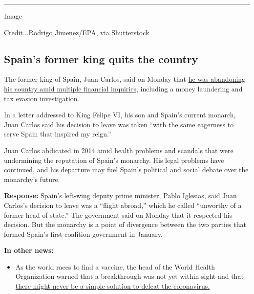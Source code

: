 \begin{center}\rule{0.5\linewidth}{\linethickness}\end{center}

Image

Credit...Rodrigo Jimenez/EPA, via Shutterstock

\hypertarget{spains-former-king-quits-the-country}{%
\subsection{Spain's former king quits the
country}\label{spains-former-king-quits-the-country}}

The former king of Spain, Juan Carlos, said on Monday that
\href{https://www.nytimes.com/2020/08/03/world/europe/juan-carlos-leaves-spain.html}{he
was abandoning his country amid multiple financial inquiries}, including
a money laundering and tax evasion investigation.

In a letter addressed to King Felipe VI, his son and Spain's current
monarch, Juan Carlos said his decision to leave was taken ``with the
same eagerness to serve Spain that inspired my reign.''

Juan Carlos abdicated in 2014 amid health problems and scandals that
were undermining the reputation of Spain's monarchy. His legal problems
have continued, and his departure may fuel Spain's political and social
debate over the monarchy's future.

\textbf{Response:} Spain's left-wing deputy prime minister, Pablo
Iglesias, said Juan Carlos's decision to leave was a ``flight abroad,''
which he called ``unworthy of a former head of state.'' The government
said on Monday that it respected his decision. But the monarchy is a
point of divergence between the two parties that formed Spain's first
coalition government in January.

\textbf{In other news:}

\begin{itemize}
\tightlist
\item
  As the world races to find a vaccine, the head of the World Health
  Organization warned that a breakthrough was not yet within sight and
  that
  \href{https://www.nytimes.com/2020/08/03/world/coronavirus-covid-19.html?action=click\&pgtype=Article\&state=default\&module=styln-coronavirus\&region=TOP_BANNER\&context=storylines_menu}{there
  might never be a simple solution to defeat the coronavirus.}
\end{itemize}

